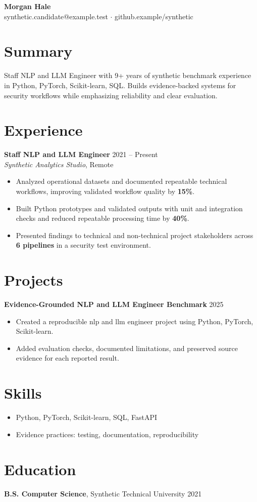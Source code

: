 \documentclass[10pt,letterpaper]{article}
\newcommand{\resumeItem}[1]{\item #1}
\newcommand{\resumeItemListStart}{\begin{itemize}[leftmargin=*]}
\newcommand{\resumeItemListEnd}{\end{itemize}}
\begin{document}
\begin{center}
{\Large \textbf{Morgan Hale}}\\
synthetic.candidate@example.test $\cdot$ github.example/synthetic
\end{center}

\section*{Summary}
Staff NLP and LLM Engineer with 9+ years of synthetic benchmark experience in Python, PyTorch, Scikit-learn, SQL. Builds evidence-backed systems for security workflows while emphasizing reliability and clear evaluation.

\section*{Experience}
\textbf{Staff NLP and LLM Engineer} \hfill 2021 -- Present\\
\textit{Synthetic Analytics Studio}, Remote
\resumeItemListStart
  \resumeItem{Analyzed operational datasets and documented repeatable technical workflows, improving validated workflow quality by \textbf{15\%}.}
  \resumeItem{Built Python prototypes and validated outputs with unit and integration checks and reduced repeatable processing time by \textbf{40\%}.}
  \resumeItem{Presented findings to technical and non-technical project stakeholders across \textbf{6 pipelines} in a security test environment.}
\resumeItemListEnd

\section*{Projects}
\textbf{Evidence-Grounded NLP and LLM Engineer Benchmark} \hfill 2025
\resumeItemListStart
  \resumeItem{Created a reproducible nlp and llm engineer project using Python, PyTorch, Scikit-learn.}
  \resumeItem{Added evaluation checks, documented limitations, and preserved source evidence for each reported result.}
\resumeItemListEnd

\section*{Skills}
\resumeItemListStart
  \resumeItem{Python, PyTorch, Scikit-learn, SQL, FastAPI}
  \resumeItem{Evidence practices: testing, documentation, reproducibility}
\resumeItemListEnd

\section*{Education}
\textbf{B.S. Computer Science}, Synthetic Technical University \hfill 2021
\end{document}
